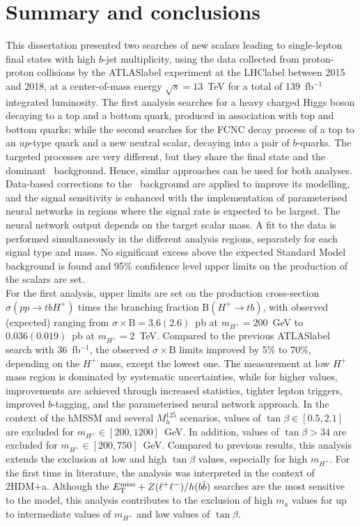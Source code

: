 \chapter{Summary and conclusions}
\label{chapter:summary}

This dissertation presented two searches of new scalars leading to single-lepton final states with high $b$-jet multiplicity, using the data collected from proton-proton collisions by the \acrshort{ATLASlabel} experiment at the \acrshort{LHClabel} between 2015 and 2018, at a center-of-mass energy $\sqrt{s}=13$~TeV for a total of 139~fb$^{-1}$ integrated luminosity. The first analysis searches for a heavy charged Higgs boson decaying to a top and a bottom quark, produced in association with top and bottom quarks; while the second searches for the FCNC decay process of a top to an $up$-type quark and a new neutral scalar, decaying into a pair of $b$-quarks. The targeted processes are very different, but they share the final state and the dominant \ttjets\ background. Hence, similar approaches can be used for both analyses. Data-based corrections to the \ttbar\ background are applied to improve its modelling, and the signal sensitivity is enhanced with the implementation of parameterised neural networks in regions where the signal rate is expected to be largest. The neural network output depends on the target scalar mass. A fit to the data is performed simultaneously in the different analysis regions, separately for each signal type and mass. No significant excess above the expected Standard Model background is found and 95\% confidence level upper limits on the production of the scalars are set.\\

For the first analysis, upper limits are set on the production cross-section $\sigma(pp\to tb H^+)$ times the branching fraction $\text{B}(H^+\to tb)$, with observed (expected) ranging from $\sigma\times\text{B}=3.6(2.6)$~pb at $m_{H^+}=200$~GeV to $0.036(0.019)$~pb at $m_{H^+}=2$~TeV. Compared to the previous \acrshort{ATLASlabel} search with 36~fb$^{-1}$, the observed $\sigma\times\text{B}$ limits improved by 5\% to 70\%, depending on the $H^+$ mass, except the lowest one. The measurement at low $H^+$ mass region is dominated by systematic uncertainties, while for higher values, improvements are achieved through increased statistics, tighter lepton triggers, improved $b$-tagging, and the parameterised neural network approach. In the context of the hMSSM and several $M_{h}^{125}$ scenarios, values of $\tan\beta\in[0.5,2.1]$ are excluded for $m_{H^+}\in[200,1200]$~GeV. In addition, values of $\tan\beta>34$ are excluded for $m_{H^+}\in[200,750]$~GeV. Compared to previous results, this analysis extends the exclusion at low and high $\tan\beta$ values, especially for high $m_{H^+}$. For the first time in literature, the analysis was interpreted in the context of 2HDM+a. Although the $E_{\text{T}}^{\text{miss}}+Z(\ell^+\ell^-)/h(b\bar{b})$ searches are the most sensitive to the model, this analysis contributes to the exclusion of high $m_a$ values for up to intermediate values of $m_{H^+}$ and low values of $\tan\beta$.\\


